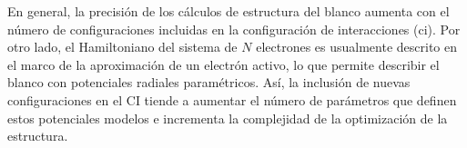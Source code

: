 En general, la precisión de los cálculos de estructura del blanco aumenta 
con el número de configuraciones incluidas en la configuración de 
interacciones (\acs{ci}). Por otro lado, el Hamiltoniano del sistema de 
$N$ electrones es usualmente descrito en el marco de la aproximación de 
un electrón activo, lo que permite describir el blanco con potenciales 
radiales paramétricos. Así, la inclusión de nuevas configuraciones en el 
CI tiende a aumentar el número de parámetros que definen estos 
potenciales modelos e incrementa la complejidad de la optimización de la 
estructura. 

